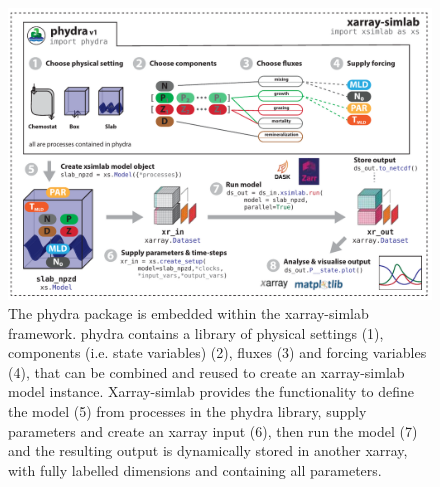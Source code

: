 \documentclass[template.tex]{subfiles}
\begin{document}
%
\begin{figure}[t]
\includegraphics[width=12cm]{Figures/firstdraft_schematics/01__schematics_phydra_1.pdf}
\caption{The phydra package is embedded within the xarray-simlab framework. phydra contains a library of physical settings (1), components (i.e. state variables) (2), fluxes (3) and forcing variables (4), that can be combined and reused to create an xarray-simlab model instance. Xarray-simlab provides the functionality to define the model (5) from processes in the phydra library, supply parameters and create an xarray input (6), then run the model (7) and the resulting output is dynamically stored in another xarray, with fully labelled dimensions and containing all parameters.}
\label{Figure:phydraschematics}
\end{figure}





\biblio
\end{document}
